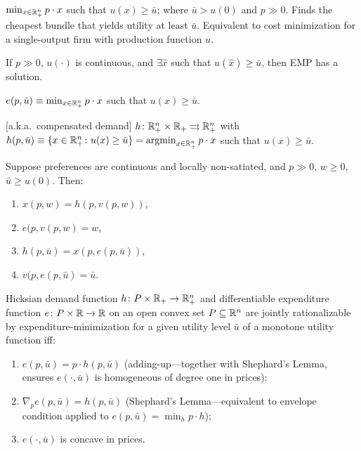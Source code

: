 \documentclass[8pt,letterpaper, landscape]{extarticle} %
\begin{document}
\begin{multicols}{3}
\begin{description}
 $ \min_{x \in \mathbb{R}^{n}_{+}} p \cdot x $ such that $ u(x) \geq \bar{u} $; where $ \bar{u} > u(0) $ and $ p \gg 0 $. Finds the cheapest bundle that yields utility at least $ \bar{u} $. Equivalent to cost minimization for a single-output firm with production function $ u $.

If $ p \gg 0 $, $ u (\cdot) $ is continuous, and $ \exists \hat{x} $ such that $ u(\hat{x}) \geq \bar{u} $, then EMP has a solution.

 $ e(p, \bar{u}) \equiv \min_{x \in \mathbb{R}^{n}_{+}} p \cdot x $ such that $ u(x) \geq \bar{u} $.

 [a.k.a.\ compensated demand] $ h \colon \mathbb{R}^{n}_{+} \times \mathbb{R}_{+} \rightrightarrows \mathbb{R}^{n}_{+} $ with $ h(p,\bar{u}) \equiv \{ x \in \mathbb{R}^{n}_{+} \colon u(x) \geq \bar{u} \} = \operatorname*{argmin}_{x \in \mathbb{R}^{n}_{+}} p \cdot x $ such that $ u(x) \geq \bar{u} $.

 Suppose preferences are continuous and locally non-satiated, and $ p \gg 0 $, $ w \geq 0 $, $ \bar{u} \geq u(0) $. Then:
\begin{enumerate}
\item $ x(p,w) = h(p,v(p,w)) $,
\item $ e(p,v(p,w) = w $,
\item $ h(p, \bar{u}) = x(p,e(p,\bar{u})) $,
\item $ v(p,e(p,\bar{u}) = \bar{u} $.
\end{enumerate}

 Hicksian demand function $ h \colon P \times \mathbb{R}_{+} \to \mathbb{R}^{n}_{+}  $ and differentiable expenditure function $ e \colon P \times \mathbb{R} \to \mathbb{R} $ on an open convex set $ P \subseteq \mathbb{R}^n $ are jointly rationalizable by expenditure-minimization for a given utility level $ \bar{u} $ of a monotone utility function iff:
\begin{enumerate}
\item $ e(p, \bar{u}) = p \cdot h(p, \bar{u}) $ (adding-up---together with Shephard's Lemma, ensures $ e (\cdot, \bar{u}) $ is homogeneous of degree one in prices);
\item $ \nabla_{p} e(p, \bar{u}) = h(p,\bar{u}) $ (Shephard's Lemma---equivalent to envelope condition applied to $ e(p, \bar{u}) = \min_{h} p \cdot h $);
\item $ e(\cdot, \bar{u}) $ is concave in prices.
\end{enumerate}


\end{description}
\end{multicols}
\end{document}
